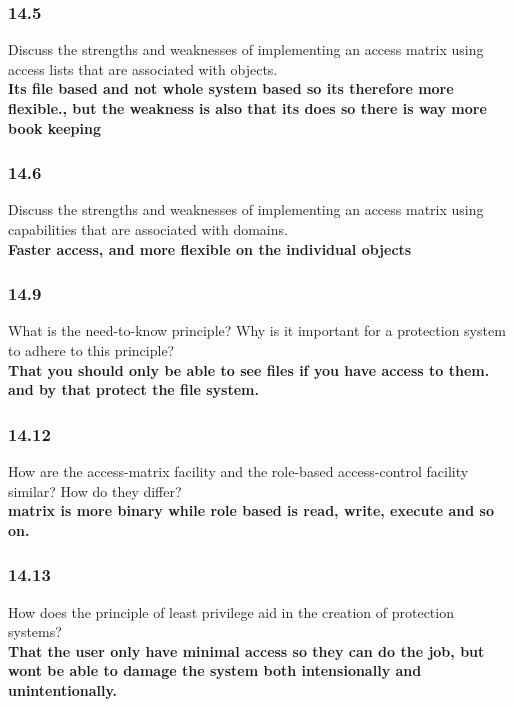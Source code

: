 \documentclass[a4paper,10pt,titlepage]{report}
\begin{document}
\subsubsection{14.5} Discuss the strengths and weaknesses of implementing an access matrix using access lists that are associated with objects. 
\\ \hspace{10mm} \textbf{Its file based and not whole system based so its therefore more flexible., but the weakness is also that its does so there is way more book keeping} \\



\subsubsection{14.6} Discuss the strengths and weaknesses of implementing an access matrix using capabilities that are associated with domains. 
\\ \hspace{10mm} \textbf{Faster access, and more flexible on the individual objects} \\


\subsubsection{14.9} What is the need-to-know principle? Why is it important for a protection system to adhere to this principle?
\\ \hspace{10mm} \textbf{That you should only be able to see files if you have access to them. and by that protect the file system.} \\


\subsubsection{14.12} How are the access-matrix facility and the role-based access-control facility similar? How do they differ?
\\ \hspace{10mm} \textbf{matrix is more binary while role based is read, write, execute and so on.} \\


\subsubsection{14.13} How does the principle of least privilege aid in the creation of protection systems?
\\ \hspace{10mm} \textbf{That the user only have minimal access so they can do the job, but wont be able to damage the system both intensionally and unintentionally. } \\
\end{document}
